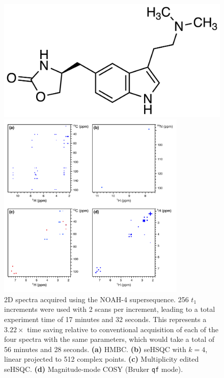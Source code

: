 \begin{figure}
    \centering
    \includegraphics{./figures/zolmi.png}\phantom{aaaaaa}

    \includegraphics[width=0.8\textwidth]{./figures/bspnspcqf.png}
    \caption{
        2D spectra acquired using the NOAH-4  supersequence.
        256 $t_1$ increments were used with 2 scans per increment, leading to a total experiment time of 17 minutes and 32 seconds.
        This represents a $3.22\times$ time saving relative to conventional acquisition of each of the four spectra with the same parameters, which would take a total of 56 minutes and 28 seconds.
        \textbf{(a)} HMBC.
        \textbf{(b)} \nitrogen{} seHSQC with $k = 4$, linear projected to 512 complex points.
        \textbf{(c)} Multiplicity edited \carbon{} seHSQC.
        \textbf{(d)} Magnitude-mode COSY (Bruker \texttt{qf} mode).
        \zolmi{}
    }
    \label{fig:bspnspcqf}
\end{figure}

